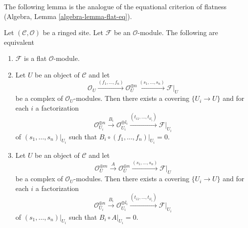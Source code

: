 \noindent
The following lemma is the analogue of the equational criterion of
flatness (Algebra, Lemma \ref{algebra-lemma-flat-eq}).

\begin{lemma}
\label{lemma-flat-eq}
Let $(\mathcal{C}, \mathcal{O})$ be a ringed site. Let $\mathcal{F}$ be an
$\mathcal{O}$-module. The following are equivalent
\begin{enumerate}
\item $\mathcal{F}$ is a flat $\mathcal{O}$-module.
\item Let $U$ be an object of $\mathcal{C}$ and let
$$
\mathcal{O}_U \xrightarrow{(f_1, \ldots, f_n)}
\mathcal{O}_U^{\oplus n} \xrightarrow{(s_1, \ldots, s_n)}
\mathcal{F}|_U
$$
be a complex of $\mathcal{O}_U$-modules. Then there exists a covering
$\{U_i \to U\}$ and for each $i$ a factorization
$$
\mathcal{O}_{U_i}^{\oplus n}
\xrightarrow{B_i}
\mathcal{O}_{U_i}^{\oplus l_i} \xrightarrow{(t_{i1}, \ldots, t_{il_i})}
\mathcal{F}|_{U_i}
$$
of $(s_1, \ldots, s_n)|_{U_i}$ such that
$B_i \circ (f_1, \ldots, f_n)|_{U_i} = 0$.
\item Let $U$ be an object of $\mathcal{C}$ and let
$$
\mathcal{O}_U^{\oplus m} \xrightarrow{A}
\mathcal{O}_U^{\oplus n} \xrightarrow{(s_1, \ldots, s_n)}
\mathcal{F}|_U
$$
be a complex of $\mathcal{O}_U$-modules. Then there exists a covering
$\{U_i \to U\}$ and for each $i$ a factorization
$$
\mathcal{O}_{U_i}^{\oplus n}
\xrightarrow{B_i}
\mathcal{O}_{U_i}^{\oplus l_i} \xrightarrow{(t_{i1}, \ldots, t_{il_i})}
\mathcal{F}|_{U_i}
$$
of $(s_1, \ldots, s_n)|_{U_i}$ such that
$B_i \circ A|_{U_i} = 0$.
\end{enumerate}
\end{lemma}

